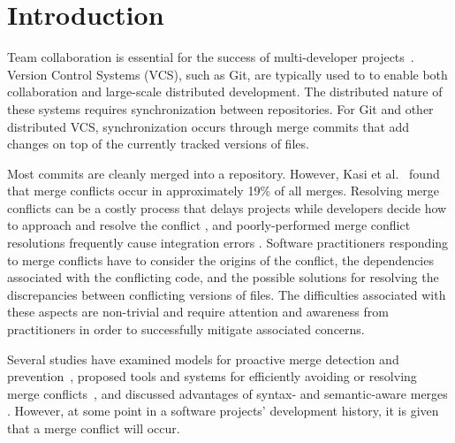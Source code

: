 \section{Introduction}\label{introduction}




Team collaboration is essential for the success of multi-developer projects~\cite{hattori2010syde}.
Version Control Systems (VCS), such as Git, are typically used to to enable both collaboration and large-scale distributed development.
The distributed nature of these systems requires synchronization between repositories.
For Git and other distributed VCS, synchronization occurs through merge commits that add changes on top of the currently tracked versions of files.

Most commits are cleanly merged into a repository.
However, Kasi et al.~\cite{cassandra} found that merge conflicts occur in approximately 19\% of all merges.
Resolving merge conflicts can be a costly process that delays projects while developers decide how to approach and resolve the conflict \cite{cassandra}, and poorly-performed merge conflict resolutions frequently cause integration errors \cite{bird-branches-conflict}.
Software practitioners responding to merge conflicts have to consider the origins of the conflict, the dependencies associated with the conflicting code, and the possible solutions for resolving the discrepancies between conflicting versions of files.
The difficulties associated with these aspects are non-trivial and require attention and awareness from practitioners in order to successfully mitigate associated concerns.

Several studies have examined models for proactive merge detection and prevention~\cite{Brun2011}\cite{palantir}\cite{Guimaraes}, proposed tools and systems for efficiently avoiding or resolving merge conflicts~\cite{nishimura}\cite{mens2002state}, and discussed advantages of syntax- and semantic-aware merges \cite{danny_refactorings}\cite{hunt2002extensible}. However, at some point in a software projects' development history, it is given that a merge conflict will occur. 

